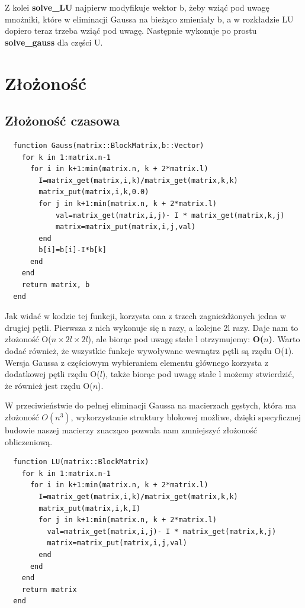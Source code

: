 \documentclass{article}
\begin{document}
 Z kolei \textbf{solve\_LU} najpierw modyfikuje wektor b, żeby wziąć pod uwagę mnożniki, które w eliminacji Gaussa na bieżąco zmieniały b, a w rozkładzie LU dopiero teraz trzeba wziąć pod uwagę. Następnie wykonuje po prostu \textbf{solve\_gauss} dla części U.
 
\section*{Złożoność}
\subsection*{Złożoność czasowa}
\begin{shaded}
\begin{verbatim}
  function Gauss(matrix::BlockMatrix,b::Vector)
    for k in 1:matrix.n-1
      for i in k+1:min(matrix.n, k + 2*matrix.l)
        I=matrix_get(matrix,i,k)/matrix_get(matrix,k,k)
        matrix_put(matrix,i,k,0.0)
        for j in k+1:min(matrix.n, k + 2*matrix.l)
            val=matrix_get(matrix,i,j)- I * matrix_get(matrix,k,j)
            matrix=matrix_put(matrix,i,j,val)
        end
        b[i]=b[i]-I*b[k]
      end
    end
    return matrix, b
  end
\end{verbatim}
\end{shaded}

Jak widać w kodzie tej funkcji, korzysta ona z trzech zagnieżdżonych jedna w drugiej pętli. Pierwsza z nich wykonuje się n razy, a kolejne 2l razy. Daje nam to złożoność O($n\times 2l\times 2l$), ale biorąc pod uwagę stałe l otrzymujemy: \textbf{O($n$)}. Warto dodać również, że wszystkie funkcje wywoływane wewnątrz pętli są rzędu O($1$). Wersja Gaussa z częściowym wybieraniem elementu głównego korzysta z dodatkowej pętli rzędu O($l$), także biorąc pod uwagę stałe l możemy stwierdzić, że również jest rzędu O($n$).

W przeciwieństwie do pełnej eliminacji Gaussa na macierzach gęstych, która ma złożoność $O(n^{3})$, wykorzystanie struktury blokowej możliwe, dzięki specyficznej budowie naszej macierzy znacząco pozwala nam zmniejszyć złożoność obliczeniową.

\begin{shaded}
\begin{verbatim}
  function LU(matrix::BlockMatrix)
    for k in 1:matrix.n-1
      for i in k+1:min(matrix.n, k + 2*matrix.l)
        I=matrix_get(matrix,i,k)/matrix_get(matrix,k,k)
        matrix_put(matrix,i,k,I)
        for j in k+1:min(matrix.n, k + 2*matrix.l)
          val=matrix_get(matrix,i,j)- I * matrix_get(matrix,k,j)
          matrix=matrix_put(matrix,i,j,val)
        end
      end
    end
    return matrix
  end 
\end{verbatim}
\end{shaded}
\end{document}
